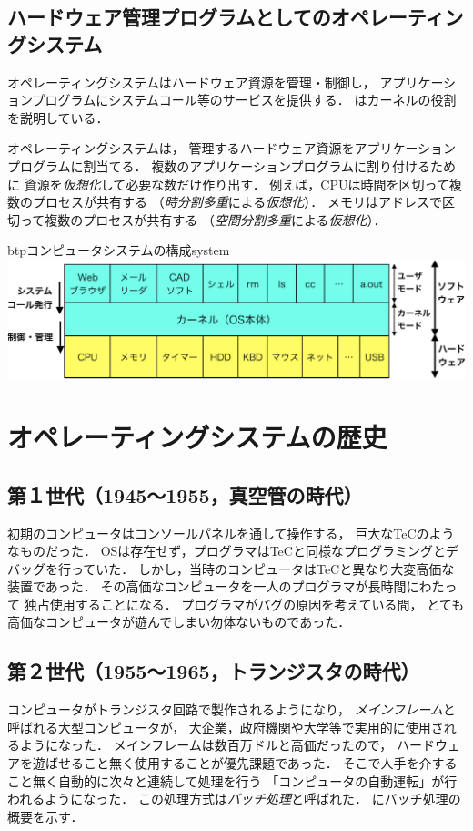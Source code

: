 \subsection{ハードウェア管理プログラムとしてのオペレーティングシステム}
オペレーティングシステムはハードウェア資源を管理・制御し，
アプリケーションプログラムにシステムコール等のサービスを提供する．
はカーネルの役割を説明している．

オペレーティングシステムは，
管理するハードウェア資源をアプリケーションプログラムに割当てる．
複数のアプリケーションプログラムに割り付けるために
資源を\emph{仮想化}して必要な数だけ作り出す．
例えば，CPUは時間を区切って複数のプロセスが共有する
（\emph{時分割多重}による\emph{仮想化}）．
メモリはアドレスで区切って複数のプロセスが共有する
（\emph{空間分割多重}による\emph{仮想化}）．

\begin{myfig}{btp}{コンピュータシステムの構成}{system}
  \includegraphics[scale=0.66]{Fig/system-crop.pdf}
\end{myfig}

\section{オペレーティングシステムの歴史}

\subsection{第１世代（1945〜1955，真空管の時代）}
初期のコンピュータはコンソールパネルを通して操作する，
巨大なTeC\cite{tec}のようなものだった．
OSは存在せず，プログラマはTeCと同様なプログラミングとデバッグを行っていた．
しかし，当時のコンピュータはTeCと異なり大変高価な装置であった．
その高価なコンピュータを一人のプログラマが長時間にわたって
独占使用することになる．
プログラマがバグの原因を考えている間，
とても高価なコンピュータが遊んでしまい勿体ないものであった．

\subsection{第２世代（1955〜1965，トランジスタの時代）}
\label{gen2nd}
コンピュータがトランジスタ回路で製作されるようになり，
\emph{メインフレーム}と呼ばれる大型コンピュータが，
大企業，政府機関や大学等で実用的に使用されるようになった．
メインフレームは数百万ドルと高価だったので，
ハードウェアを遊ばせること無く使用することが優先課題であった．
そこで人手を介すること無く自動的に次々と連続して処理を行う
「コンピュータの自動運転」が行われるようになった．
この処理方式は\emph{バッチ処理}と呼ばれた．
にバッチ処理の概要を示す．

